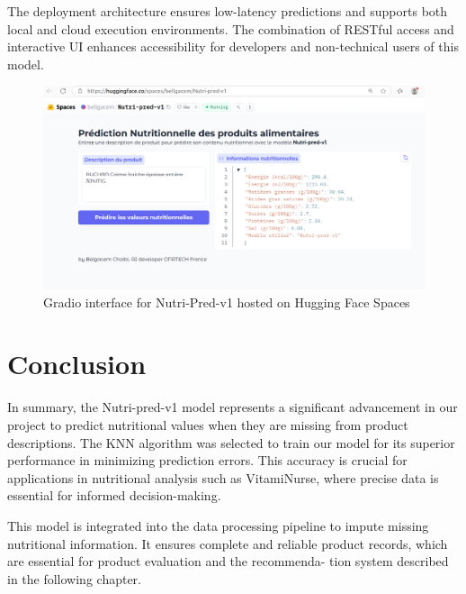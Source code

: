 \vspace{1cm}
The deployment architecture ensures low-latency predictions and supports both local and cloud execution environments. The combination of RESTful access and interactive UI enhances accessibility for developers and non-technical users of this model.

\begin{figure}[H]
    \centering
    \includegraphics[width=1.15\textwidth]{images/Nutri-pred_Huggingface.png}
    \caption{Gradio interface for Nutri-Pred-v1 hosted on Hugging Face Spaces}
    \label{fig:gradio_ui}
\end{figure}
\vspace{1cm}
\section{Conclusion}
\par In summary, the Nutri-pred-v1 model represents a significant advancement in our project to predict nutritional values when they are missing
from product descriptions. The KNN algorithm was selected to train
our model for its superior performance in minimizing prediction errors.
This accuracy is crucial for applications in nutritional analysis such as
VitamiNurse, where precise data is essential for informed decision-making.
\par This model is integrated into the data processing pipeline to impute
missing nutritional information. It ensures complete and reliable product
records, which are essential for product evaluation and the recommenda-
tion system described in the following chapter.